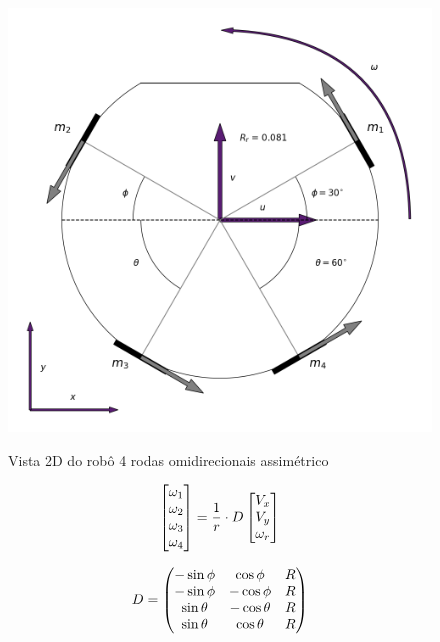\documentclass[deposito, acronym, symbols]{fei}
\begin{document}
\begin{figure}[!htb]
    \centering
    \caption{Vista 2D do robô 4 rodas omidirecionais assimétrico}
    \includegraphics[scale=0.65]{Imagens/topview.png}
    \label{fig:topview}
\end{figure}

\begin{equation} \label{eq:cindireta_1}
\centering  
\begin{bmatrix}\omega_1\\\omega_2\\\omega_3\\\omega_4\end{bmatrix} = \frac{1}{r} \cdot D
   \begin{bmatrix}V_x\\V_y\\\omega_r\end{bmatrix}  
\end{equation}


\begin{equation} \label{eq:cindireta}
\centering  
D = 
\begin{pmatrix}
    -\sin\phi & \cos\phi & R \\ 
    -\sin\phi & -\cos\phi & R \\ 
    \sin\theta & -\cos\theta & R \\ 
    \sin\theta & \cos\theta & R
\end{pmatrix}
\end{equation}
\end{document}
